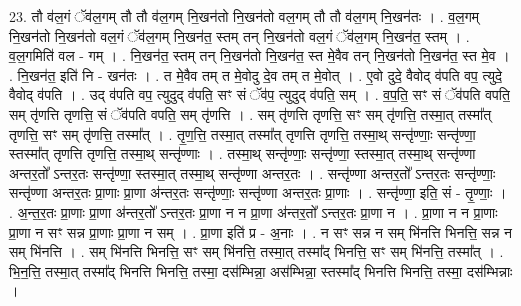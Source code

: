 \documentclass[17pt]{extarticle}
\begin{document}
23. तौ व॑ल॒गं ॅव॑ल॒गम् तौ तौ व॑ल॒गम् नि॒खन॑तो नि॒खन॑तो वल॒गम् तौ तौ व॑ल॒गम् नि॒खन॑तः । . व॒ल॒गम् नि॒खन॑तो नि॒खन॑तो वल॒गं ॅव॑ल॒गम् नि॒खन॑त॒ स्तम् तन् नि॒खन॑तो वल॒गं ॅव॑ल॒गम् नि॒खन॑त॒ स्तम् । . व॒ल॒गमिति॑ वल - गम् । . नि॒खन॑त॒ स्तम् तन् नि॒खन॑तो नि॒खन॑त॒ स्त मे॒वैव तन् नि॒खन॑तो नि॒खन॑त॒ स्त मे॒व । . नि॒खन॑त॒ इति॑ नि - खन॑तः । . त मे॒वैव तम् त मे॒वोदु दे॒व तम् त मे॒वोत् । . ए॒वो दुदे॒ वैवोद् व॑पति वप॒ त्युदे॒ वैवोद् व॑पति । . उद् व॑पति वप॒ त्युदुद् व॑पति॒ सꣳ सं ॅव॑प॒ त्युदुद् व॑पति॒ सम् । . व॒प॒ति॒ सꣳ सं ॅव॑पति वपति॒ सम् तृ॑णत्ति तृणत्ति॒ सं ॅव॑पति वपति॒ सम् तृ॑णत्ति । . सम् तृ॑णत्ति तृणत्ति॒ सꣳ सम् तृ॑णत्ति॒ तस्मा॒त् तस्मा᳚त् तृणत्ति॒ सꣳ सम् तृ॑णत्ति॒ तस्मा᳚त् । . तृ॒ण॒त्ति॒ तस्मा॒त् तस्मा᳚त् तृणत्ति तृणत्ति॒ तस्मा॒थ् सन्तृ॑ण्णाः॒ सन्तृ॑ण्णा॒ स्तस्मा᳚त् तृणत्ति तृणत्ति॒ तस्मा॒थ् सन्तृ॑ण्णाः । . तस्मा॒थ् सन्तृ॑ण्णाः॒ सन्तृ॑ण्णा॒ स्तस्मा॒त् तस्मा॒थ् सन्तृ॑ण्णा अन्तर॒तो᳚ ऽन्तर॒तः सन्तृ॑ण्णा॒ स्तस्मा॒त् तस्मा॒थ् सन्तृ॑ण्णा अन्तर॒तः । . सन्तृ॑ण्णा अन्तर॒तो᳚ ऽन्तर॒तः सन्तृ॑ण्णाः॒ सन्तृ॑ण्णा अन्तर॒तः प्रा॒णाः प्रा॒णा अ॑न्तर॒तः सन्तृ॑ण्णाः॒ सन्तृ॑ण्णा अन्तर॒तः प्रा॒णाः । . सन्तृ॑ण्णा॒ इति॒ सं - तृ॒ण्णाः॒ । . अ॒न्त॒र॒तः प्रा॒णाः प्रा॒णा अ॑न्तर॒तो᳚ ऽन्तर॒तः प्रा॒णा न न प्रा॒णा अ॑न्तर॒तो᳚ ऽन्तर॒तः प्रा॒णा न । . प्रा॒णा न न प्रा॒णाः प्रा॒णा न सꣳ सन्न प्रा॒णाः प्रा॒णा न सम् । . प्रा॒णा इति॑ प्र - अ॒नाः । . न सꣳ सन्न न सम् भि॑नत्ति भिनत्ति॒ सन्न न सम् भि॑नत्ति । . सम् भि॑नत्ति भिनत्ति॒ सꣳ सम् भि॑नत्ति॒ तस्मा॒त् तस्मा᳚द् भिनत्ति॒ सꣳ सम् भि॑नत्ति॒ तस्मा᳚त् । . भि॒न॒त्ति॒ तस्मा॒त् तस्मा᳚द् भिनत्ति भिनत्ति॒ तस्मा॒ दस॑म्भिन्ना॒ अस॑म्भिन्ना॒ स्तस्मा᳚द् भिनत्ति भिनत्ति॒ तस्मा॒ दस॑म्भिन्नाः । \newline
\end{document}
